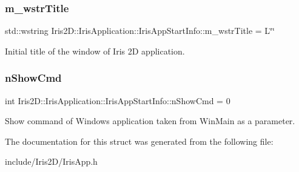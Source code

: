 \subsubsection{\texorpdfstring{m\+\_\+wstr\+Title}{m\_wstrTitle}}
{\footnotesize\ttfamily std\+::wstring Iris2\+D\+::\+Iris\+Application\+::\+Iris\+App\+Start\+Info\+::m\+\_\+wstr\+Title = L\char`\"{}\char`\"{}}



Initial title of the window of Iris 2D application. 

\mbox{\label{struct_iris2_d_1_1_iris_application_1_1_iris_app_start_info_a45353664bb0d0719cb06eb7763263d7d}} 
\subsubsection{\texorpdfstring{n\+Show\+Cmd}{nShowCmd}}
{\footnotesize\ttfamily int Iris2\+D\+::\+Iris\+Application\+::\+Iris\+App\+Start\+Info\+::n\+Show\+Cmd = 0}



Show command of Windows application taken from Win\+Main as a parameter. 



The documentation for this struct was generated from the following file\+:\begin{DoxyCompactItemize}
\item 
include/\+Iris2\+D/Iris\+App.\+h\end{DoxyCompactItemize}
